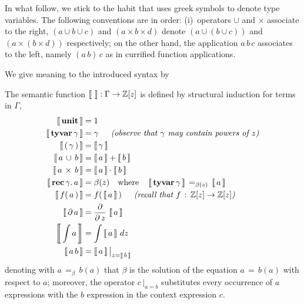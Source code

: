In what follow, we stick to the habit that uses greek symbols to denote type
variables. The following conventions are in order: (i)~operators $\cup$ and
$\times$ associate to the right, $(a \cup b \cup c)$ and $(a \times b
\times d)$ denote $\left(a \cup (b \cup c)\right)$ and $(a \times (b
\times d))$ respectively; on the other hand, the application $a\,b\,c$
associates to the left, namely $(a\,b)\,c$ as in currified function
applications.

We give meaning to the introduced syntax by
\begin{definition}[Semantic]
The semantic function $\left\llbracket\,\,\right\rrbracket: \Gamma \rightarrow
\mathbb{Z}[z]$ is defined by structural induction for terms in $\Gamma$,
\begin{displaymath}
\begin{split}
    \semantic{\tyunit} &= 1 \\
    \semantic{\tyvar{\gamma}} &= \gamma\indent\textit{(observe that $\gamma$ may contain powers of $z$)} \\
    \semantic{\typarens{\gamma}} &= \semantic{\gamma}\\
    \semantic{\tydu{a}{b}} &= \semantic{a} + \semantic{b} \\
    \semantic{\tycp{a}{b}} &= \semantic{a}\cdot\semantic{b} \\
    \semantic{\textbf{rec}\,\gamma.\,a} &= \beta(z)  \quad\text{where}\quad
        \semantic{\textbf{tyvar}\,\gamma}\,=_{\beta(z)}\,\semantic{a}\\
    \semantic{f(\,a\,)} &= f(\,\semantic{a}\,)\indent\textit{(recall that $f\,:\,\mathbb{Z}[z]\rightarrow\mathbb{Z}[z]$)}\\
    \semantic{\partial\,a} &= \frac{\partial}{\partial\,z}\,\semantic{a}\\
    \semantic{\int{a}} &= \int{\semantic{a}\,dz}\\
    \semantic{a\,b} &= \semantic{a}\big|_{z=\semantic{b}}\\
\end{split}
\end{displaymath}
denoting with $a\,=_{\beta}\,b(a)$ that $\beta$ is the solution of the equation
$a\,=\,b(a)$ with respect to $a$; moreover, the operator $c\,\big|_{a=b}$
substitutes every occurrence of $a$ expressions with the $b$ expression in the
context expression $c$.
\end{definition}

